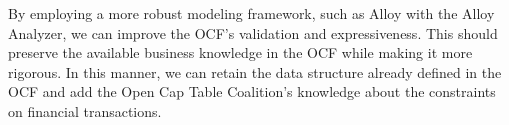 By employing a more robust modeling framework, such as Alloy with the Alloy Analyzer, we can improve the OCF's validation and expressiveness. This should preserve the available business knowledge in the OCF while making it more rigorous. In this manner, we can retain the data structure already defined in the OCF and add the Open Cap Table Coalition's knowledge about the constraints on financial transactions.





